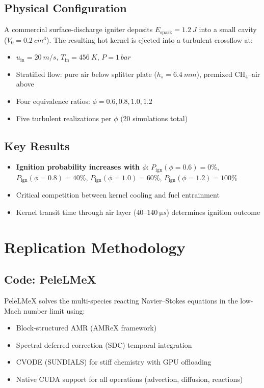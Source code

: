 \documentclass[11pt]{article}
\begin{document}
\subsection{Physical Configuration}
A commercial surface-discharge igniter deposits $E_\mathrm{spark} = \SI{1.2}{J}$ into a small cavity ($V_0 = \SI{0.2}{cm^3}$). The resulting hot kernel is ejected into a turbulent crossflow at:
\begin{itemize}[leftmargin=*]
    \item $u_\mathrm{in} = \SI{20}{m/s}$, $T_\mathrm{in} = \SI{456}{K}$, $P = \SI{1}{bar}$
    \item Stratified flow: pure air below splitter plate ($h_s = \SI{6.4}{mm}$), premixed CH$_4$--air above
    \item Four equivalence ratios: $\phi = 0.6, 0.8, 1.0, 1.2$
    \item Five turbulent realizations per $\phi$ (20 simulations total)
\end{itemize}

\subsection{Key Results}
\begin{itemize}[leftmargin=*]
    \item \textbf{Ignition probability increases with $\phi$}: $P_\mathrm{ign}(\phi{=}0.6) = 0\%$, $P_\mathrm{ign}(\phi{=}0.8) = 40\%$, $P_\mathrm{ign}(\phi{=}1.0) = 60\%$, $P_\mathrm{ign}(\phi{=}1.2) = 100\%$
    \item Critical competition between kernel cooling and fuel entrainment
    \item Kernel transit time through air layer ($40$--$\SI{140}{\micro s}$) determines ignition outcome
\end{itemize}

\section{Replication Methodology}

\subsection{Code: PeleLMeX}
PeleLMeX solves the multi-species reacting Navier--Stokes equations in the low-Mach number limit using:
\begin{itemize}[leftmargin=*]
    \item Block-structured AMR (AMReX framework)
    \item Spectral deferred correction (SDC) temporal integration
    \item CVODE (SUNDIALS) for stiff chemistry with GPU offloading
    \item Native CUDA support for all operations (advection, diffusion, reactions)
\end{itemize}
\end{document}
